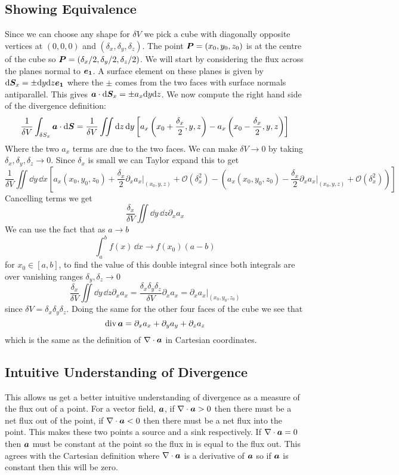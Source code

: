 \documentclass{article}
\newcommand{\divword}{\mathop{\mathrm{div}}}
\begin{document}
    \subsection{Showing Equivalence}
    Since we can choose any shape for \(\delta V\) we pick a cube with diagonally opposite vertices at \((0, 0, 0)\) and \((\delta_x, \delta_y, \delta_z)\).
    The point \(\bm{P} = (x_0, y_0, z_0)\) is at the centre of the cube so \(\bm{P} = (\delta_x/2, \delta_y/2, \delta_z/2)\).
    We will start by considering the flux across the planes normal to \(\bm{e_{1}}\).
    A surface element on these planes is given by \(\dd\bm{S}_x = \pm\dd y\dd z\bm{e_{1}}\) where the \(\pm\) comes from the two faces with surface normals antiparallel.
    This gives \(\bm{a}\cdot\dd\bm{S}_x = \pm a_x\dd y\dd z\).
    We now compute the right hand side of the divergence definition:
    \[\frac{1}{\delta V}\int_{\delta S_x}\bm{a}\cdot\dd\bm{S} = \frac{1}{\delta V}\iint\dd z\,\dd y\left[a_x\left(x_0 + \frac{\delta_x}{2}, y, z\right) - a_x\left(x_0 - \frac{\delta_x}{2}, y, z\right)\right]\]
    Where the two \(a_x\) terms are due to the two faces.
    We can make \(\delta V\to 0\) by taking \(\delta_x, \delta_y, \delta_z\to 0\).
    Since \(\delta_x\) is small we can Taylor expand this to get
    \[\frac{1}{\delta V}\iint\dd y\,\dd x \left[a_x(x_0, y_0, z_0) + \frac{\delta_x}{2}\partial_x a_x|_{(x_0, y, z)} + \mathcal{O}(\delta_x^2) - \left(a_x(x_0, y_0, z_0) - \frac{\delta_x}{2}\partial_x a_x|_{(x_0, y, z)} + \mathcal{O}(\delta_x^2)\right)\right]\]
    Cancelling terms we get
    \[\frac{\delta_x}{\delta V}\iint\dd y\,\dd z\partial_xa_x\]
    We can use the fact that as \(a\to b\)
    \[\int_a^b f(x)\,\dd x \to f(x_0)(a - b)\]
    for \(x_0\in[a, b]\), to find the value of this double integral since both integrals are over vanishing ranges \(\delta_y, \delta_z\to 0\)
    \[\frac{\delta_x}{\delta V}\iint\dd y\,\dd z\partial_x a_x = \frac{\delta_x\delta_y\delta_z}{\delta V}\partial_x a_x = \partial_x a_x|_{(x_0, y_0, z_0)}\]
    since \(\delta V = \delta_x\delta_y\delta_z\).
    Doing the same for the other four faces of the cube we see that
    \[\divword \vv a = \partial_x a_x + \partial_y a_y + \partial_z a_z\]
    which is the same as the definition of \(\nabla\cdot\bm{a}\) in Cartesian coordinates.
    
    \subsection{Intuitive Understanding of Divergence}
    This allows us get a better intuitive understanding of divergence as a measure of the flux out of a point.
    For a vector field, \(\bm{a}\), if \(\nabla\cdot\bm{a} > 0\) then there must be a net flux out of the point, if \(\nabla\cdot\bm{a} < 0\) then there must be a net flux into the point.
    This makes these two points a source and a sink respectively.
    If \(\nabla\cdot\bm{a} = 0\) then \(\bm{a}\) must be constant at the point so the flux in is equal to the flux out.
    This agrees with the Cartesian definition where \(\nabla\cdot\bm{a}\) is a derivative of \(\bm{a}\) so if \(\bm{a}\) is constant then this will be zero.
    
\end{document}
